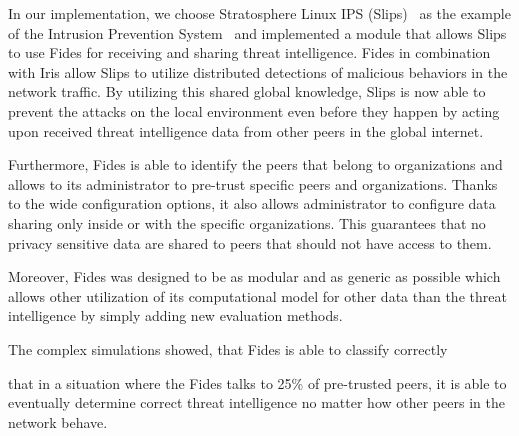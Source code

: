 In our implementation, we choose Stratosphere Linux IPS (Slips)~\cite{slips} as the example of the Intrusion Prevention System~\cite{zhang2004intrusion} and implemented a module that allows Slips to use Fides for receiving and sharing threat intelligence. Fides in combination with Iris allow Slips to utilize distributed detections of malicious behaviors in the network traffic.
By utilizing this shared global knowledge, Slips is now able to prevent the attacks on the local environment even before they happen by acting upon received threat intelligence data from other peers in the global internet.

Furthermore, Fides is able to identify the peers that belong to organizations and allows to its administrator to pre-trust specific peers and organizations. Thanks to the wide configuration options, it also allows administrator to configure data sharing only inside or with the specific organizations. This guarantees that no privacy sensitive data are shared to peers that should not have access to them.

Moreover, Fides was designed to be as modular and as generic as possible which allows other utilization of its computational model for other data than the threat intelligence by simply adding new evaluation methods.

The complex simulations showed, that Fides is able to classify correctly

that in a situation where the Fides talks to 25\% of pre-trusted peers, it is able to eventually determine correct threat intelligence no matter how other peers in the network behave.

